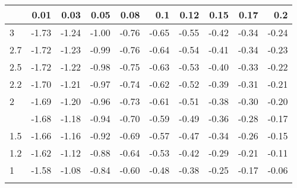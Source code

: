 
\begin{tabular}{lrrrrrrrrr}
\toprule{}
  & 0.01 & 0.03 & 0.05 & 0.08 & 0.1 & 0.12 & 0.15 & 0.17 & 0.2\\
\midrule{}
3 & -1.73 & -1.24 & -1.00 & -0.76 & -0.65 & -0.55 & -0.42 & -0.34 & -0.24\\
2.7 & -1.72 & -1.23 & -0.99 & -0.76 & -0.64 & -0.54 & -0.41 & -0.34 & -0.23\\
2.5 & -1.72 & -1.22 & -0.98 & -0.75 & -0.63 & -0.53 & -0.40 & -0.33 & -0.22\\
2.2 & -1.70 & -1.21 & -0.97 & -0.74 & -0.62 & -0.52 & -0.39 & -0.31 & -0.21\\
2 & -1.69 & -1.20 & -0.96 & -0.73 & -0.61 & -0.51 & -0.38 & -0.30 & -0.20\\
\addlinespace
1.7 & -1.68 & -1.18 & -0.94 & -0.70 & -0.59 & -0.49 & -0.36 & -0.28 & -0.17\\
1.5 & -1.66 & -1.16 & -0.92 & -0.69 & -0.57 & -0.47 & -0.34 & -0.26 & -0.15\\
1.2 & -1.62 & -1.12 & -0.88 & -0.64 & -0.53 & -0.42 & -0.29 & -0.21 & -0.11\\
1 & -1.58 & -1.08 & -0.84 & -0.60 & -0.48 & -0.38 & -0.25 & -0.17 & -0.06\\
\bottomrule{}
\end{tabular}
